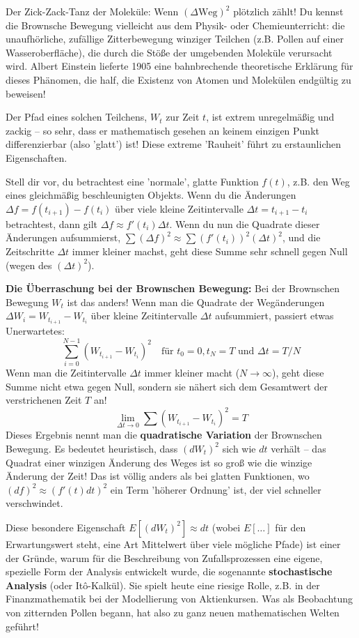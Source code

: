 \begin{funfactbox}{Der Zick-Zack-Tanz der Moleküle: Wenn $(\Delta \text{Weg})^2$ plötzlich zählt!}
Du kennst die Brownsche Bewegung vielleicht aus dem Physik- oder Chemieunterricht: die unaufhörliche, zufällige Zitterbewegung winziger Teilchen (z.B. Pollen auf einer Wasseroberfläche), die durch die Stöße der umgebenden Moleküle verursacht wird. Albert Einstein lieferte 1905 eine bahnbrechende theoretische Erklärung für dieses Phänomen, die half, die Existenz von Atomen und Molekülen endgültig zu beweisen!

Der Pfad eines solchen Teilchens, $W_t$ zur Zeit $t$, ist extrem unregelmäßig und zackig – so sehr, dass er mathematisch gesehen an keinem einzigen Punkt differenzierbar (also 'glatt') ist! Diese extreme 'Rauheit' führt zu erstaunlichen Eigenschaften.

Stell dir vor, du betrachtest eine 'normale', glatte Funktion $f(t)$, z.B. den Weg eines gleichmäßig beschleunigten Objekts. Wenn du die Änderungen $\Delta f = f(t_{i+1}) - f(t_i)$ über viele kleine Zeitintervalle $\Delta t = t_{i+1} - t_i$ betrachtest, dann gilt $\Delta f \approx f'(t_i) \Delta t$. Wenn du nun die Quadrate dieser Änderungen aufsummierst, $\sum (\Delta f)^2 \approx \sum (f'(t_i))^2 (\Delta t)^2$, und die Zeitschritte $\Delta t$ immer kleiner machst, geht diese Summe sehr schnell gegen Null (wegen des $(\Delta t)^2$).

\textbf{Die Überraschung bei der Brownschen Bewegung:}
Bei der Brownschen Bewegung $W_t$ ist das anders! Wenn man die Quadrate der Wegänderungen $\Delta W_i = W_{t_{i+1}} - W_{t_i}$ über kleine Zeitintervalle $\Delta t$ aufsummiert, passiert etwas Unerwartetes:
\[ \sum_{i=0}^{N-1} (W_{t_{i+1}} - W_{t_i})^2 \quad \text{für } t_0=0, t_N=T \text{ und } \Delta t = T/N \]
Wenn man die Zeitintervalle $\Delta t$ immer kleiner macht ($N \to \infty$), geht diese Summe nicht etwa gegen Null, sondern sie nähert sich dem Gesamtwert der verstrichenen Zeit $T$ an!
\[ \lim_{\Delta t \to 0} \sum (W_{t_{i+1}} - W_{t_i})^2 = T \]
Dieses Ergebnis nennt man die \textbf{quadratische Variation} der Brownschen Bewegung. Es bedeutet heuristisch, dass $(dW_t)^2$ sich wie $dt$ verhält – das Quadrat einer winzigen Änderung des Weges ist so groß wie die winzige Änderung der Zeit! Das ist völlig anders als bei glatten Funktionen, wo $(df)^2 \approx (f'(t)dt)^2$ ein Term 'höherer Ordnung' ist, der viel schneller verschwindet.

Diese besondere Eigenschaft $E[(dW_t)^2] \approx dt$ (wobei $E[\dots]$ für den Erwartungswert steht, eine Art Mittelwert über viele mögliche Pfade) ist einer der Gründe, warum für die Beschreibung von Zufallsprozessen eine eigene, spezielle Form der Analysis entwickelt wurde, die sogenannte \textbf{stochastische Analysis} (oder Itô-Kalkül). Sie spielt heute eine riesige Rolle, z.B. in der Finanzmathematik bei der Modellierung von Aktienkursen. Was als Beobachtung von zitternden Pollen begann, hat also zu ganz neuen mathematischen Welten geführt!


\end{funfactbox}

